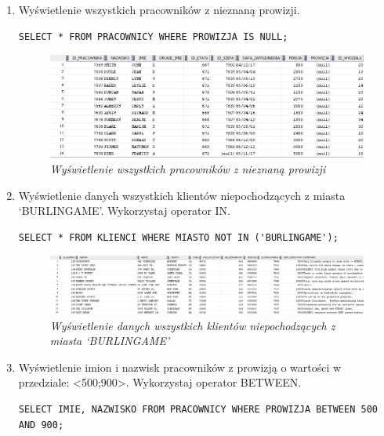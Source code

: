 \documentclass[a4paper, 10pt]{article}
\begin{document}
\begin{enumerate}
\newpage

\item Wyświetlenie wszystkich pracowników z nieznaną prowizji.  
\begin{lstlisting}[style=SQL, caption=\textit{Wyświetlenie wszystkich pracowników z nieznaną prowizji}]
SELECT * FROM PRACOWNICY WHERE PROWIZJA IS NULL;
\end{lstlisting}

\begin{figure}[H]
	\centering
	\includegraphics[scale=0.7]{zadanie3.png}
	\caption{\textit{Wyświetlenie wszystkich pracowników z nieznaną prowizji}}
\end{figure}


\item Wyświetlenie danych wszystkich klientów niepochodzących z miasta `BURLINGAME'. Wykorzystaj operator IN. 
\begin{lstlisting}[style=SQL, caption=\textit{Wyświetlenie danych wszystkich klientów niepochodzących z miasta `BURLINGANE'}]
SELECT * FROM KLIENCI WHERE MIASTO NOT IN ('BURLINGAME');
\end{lstlisting}

\begin{figure}[H]
	\centering
	\includegraphics[scale=0.5]{zadanie4.png}
	\caption{\textit{Wyświetlenie danych wszystkich klientów niepochodzących z miasta `BURLINGAME'}}
\end{figure}


\item Wyświetlenie imion i nazwisk pracowników z prowizją o wartości w przedziale: <500;900>. Wykorzystaj operator BETWEEN. 
\begin{lstlisting}[style=SQL, caption=\textit{Wyświetlenie imion i nazwisk pracowników z prowizją o wartości w przedziale: <500;900>}]
SELECT IMIE, NAZWISKO FROM PRACOWNICY WHERE PROWIZJA BETWEEN 500 AND 900;
\end{lstlisting}


\end{enumerate}
\end{document}
